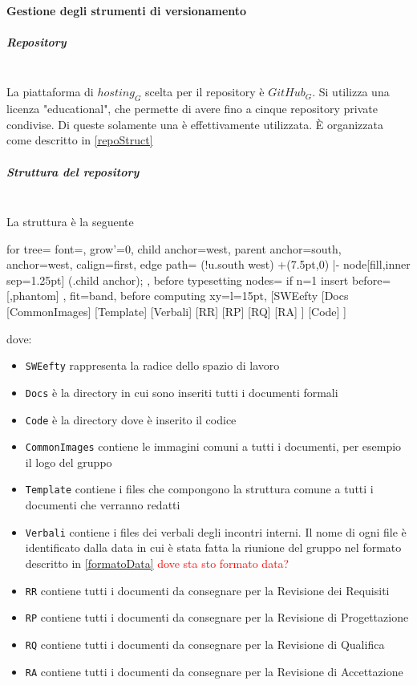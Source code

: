 		\paragraph{Gestione degli strumenti di versionamento}
			\subparagraph{Repository}\mbox{} \\
			La piattaforma di $hosting_G$ scelta per il repository è $GitHub_G$. Si utilizza una licenza "educational", che permette di avere fino a cinque repository private condivise. Di queste solamente una è effettivamente utilizzata. È organizzata come descritto in \ref{repoStruct}
			\subparagraph{Struttura del repository}\mbox{} \\
			\label{repoStruct}
			La struttura è la seguente\\
			\begin{center}
			\begin{forest}
				for tree={
					font=\ttfamily,
					grow'=0,
					child anchor=west,
					parent anchor=south,
					anchor=west,
					calign=first,
					edge path={
						\noexpand{}
						(!u.south west) +(7.5pt,0) |- node[fill,inner sep=1.25pt] {} (.child anchor);
					},
					before typesetting nodes={
						if n=1
						{insert before={[,phantom]}}
						{}
					},
					fit=band,
					before computing xy={l=15pt},
				}
				[SWEefty
					[Docs
						[CommonImages]
						[Template]
						[Verbali]
						[RR]
						[RP]
						[RQ]
						[RA]
					]
					[Code]
				]
			\end{forest}
			\end{center}
			dove:
			\begin{itemize}
				\item \texttt{SWEefty} rappresenta la radice dello spazio di lavoro
				\item \texttt{Docs} è la directory in cui sono inseriti tutti i documenti formali
				\item \texttt{Code} è la directory dove è inserito il codice
				\item \texttt{CommonImages} contiene le immagini comuni a tutti i documenti, per esempio il logo del gruppo
				\item \texttt{Template} contiene i files che compongono la struttura comune a tutti i documenti che verranno redatti
				\item \texttt{Verbali} contiene i files dei verbali degli incontri interni. Il nome di ogni file è identificato dalla data in cui è stata fatta la riunione del gruppo nel formato descritto in \ref{formatoData} \textcolor{red}{dove sta sto formato data?}
				\item \texttt{RR} contiene tutti i documenti da consegnare per la Revisione dei Requisiti
				\item \texttt{RP} contiene tutti i documenti da consegnare per la Revisione di Progettazione
				\item \texttt{RQ} contiene tutti i documenti da consegnare per la Revisione di Qualifica
				\item \texttt{RA} contiene tutti i documenti da consegnare per la Revisione di Accettazione
				  				
			\end{itemize}
			
